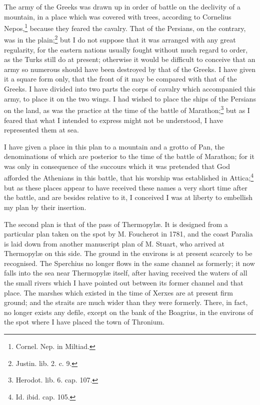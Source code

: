 \documentclass[a4paper, 11pt, oneside, polutonikogreek, english]{article}
\begin{document}
The army of the Greeks was drawn up in order of battle on the declivity of a mountain, in a place which was covered with trees, according to Cornelius Nepos,\footnote{Cornel. Nep. in Miltiad.} because they feared the cavalry. That of the Persians, on the contrary, was in the plain;\footnote{Justin. lib. 2. c. 9.} but I do not suppose that it was arranged with any great regularity, for the eastern nations usually fought without much regard to order, as the Turks still do at present; otherwise it would be difficult to conceive that an army so numerous should have been destroyed by that of the Greeks. I have given it a square form only, that the front of it may be compared with that of the Greeks. I have divided into two parts the corps of cavalry which accompanied this army, to place it on the two wings. I had wished to place the ships of the Persians on the land, as was the practice at the time of the battle of Marathon;\footnote{Herodot. lib. 6. cap. 107.} but as I feared that what I intended to express might not be understood, I have represented them at sea.

I have given a place in this plan to a mountain and a grotto of Pan, the denominations of which are posterior to the time of the battle of Marathon; for it was only in consequence of the succours which it was pretended that God afforded the Athenians in this battle, that his worship was established in Attica;\footnote{Id. ibid. cap. 105.} but as these places appear to have received these names a very short time after the battle, and are besides relative to it, I conceived I was at liberty to embellish my plan by their insertion.

The second plan is that of the pass of Thermopylæ. It is designed from a particular plan taken on the spot by M. Foucherot in 1781, and the coast Paralia is laid down from another manuscript plan of M. Stuart, who arrived at Thermopylæ on this side. The ground in the environs is at present scarcely to be recognised. The Sperchius no longer flows in the same channel as formerly; it now falls into the sea near Thermopylæ itself, after having received the waters of all the small rivers which I have pointed out between its former channel and that place. The marshes which existed in the time of Xerxes are at present firm ground; and the straits are much wider than they were formerly. There, in fact, no longer exists any defile, except on the bank of the Boagrius, in the environs of the spot where I have placed the town of Thronium.
\end{document}

